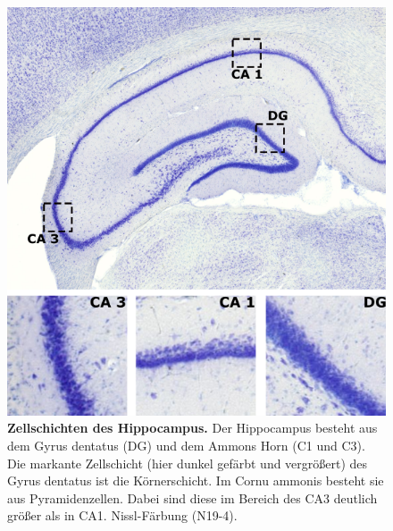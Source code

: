 \begin{figure}[H]
    \centering
    \includegraphics{pictures/Basalganglia/schichten_hippocampus.png}
    \caption[Zellschichten des Hippocampus]{\textbf{Zellschichten des Hippocampus.} Der Hippocampus besteht aus dem Gyrus dentatus (DG) und dem Ammons Horn (C1 und C3). Die markante Zellschicht (hier dunkel gefärbt und vergrößert) des Gyrus dentatus ist die Körnerschicht. Im Cornu ammonis besteht sie aus Pyramidenzellen. Dabei sind diese im Bereich des CA3 deutlich größer als in CA1. Nissl-Färbung (N19-4).}
    \label{fig:Hippocampus_zellschicht}
\end{figure}

